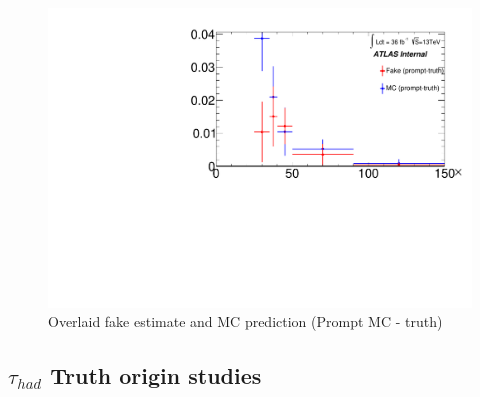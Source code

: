 \documentclass[11pt]{article}
\begin{document}
	\begin{figure}[H]
		\centering
		\includegraphics[width=0.7\linewidth]{figures/FakesEstimate_data_pp8_nonallhad_new_scaledHists/Overlay_FF_tau_pt_prompt-truth.pdf}
		\caption{Overlaid fake estimate and MC prediction (Prompt MC - truth)}
	\end{figure}		


	\subsection{$\tau_{had}$ Truth origin studies} 	
\end{document}
